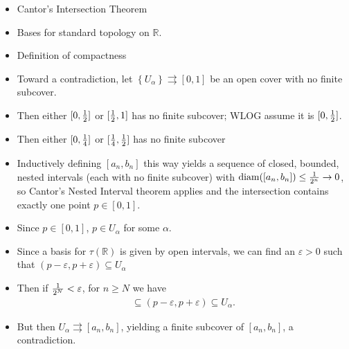\begin{solution}

\hfill

\begin{concept}

\hfill

\begin{itemize}
\tightlist
\item
  Cantor's Intersection Theorem
\item
  Bases for standard topology on \({\mathbb{R}}\).
\item
  Definition of compactness
\end{itemize}

\end{concept}

\begin{itemize}
\tightlist
\item
  Toward a contradiction, let
  \(\left\{{U_\alpha}\right\} \rightrightarrows[0, 1]\) be an open cover
  with no finite subcover.
\item
  Then either \([0, {1\over 2}]\) or \([{1\over 2}, 1]\) has no finite
  subcover; WLOG assume it is \([0, {1\over 2}]\).
\item
  Then either \([0, {1\over 4}]\) or \([{1\over 4}, {1\over 2}]\) has no
  finite subcover
\item
  Inductively defining \([a_n, b_n]\) this way yields a sequence of
  closed, bounded, nested intervals (each with no finite subcover) with
  \({\operatorname{diam}}([a_n, b_n]) \leq {1 \over 2^n} \to 0\), so
  Cantor's Nested Interval theorem applies and the intersection contains
  exactly one point \(p \in [0, 1]\).
\item
  Since \(p\in [0, 1]\), \(p\in U_\alpha\) for some \(\alpha\).
\item
  Since a basis for \(\tau({\mathbb{R}})\) is given by open intervals,
  we can find an \(\varepsilon>0\) such that
  \((p-\varepsilon, p+\varepsilon) \subseteq U_\alpha\)
\item
  Then if \({1\over 2^N} < \varepsilon\), for \(n\geq N\) we have
  \begin{align*}[a_n, b_n] \subseteq (p-\varepsilon, p+\varepsilon) \subseteq U_\alpha.\end{align*}
\item
  But then \(U_\alpha \rightrightarrows[a_n, b_n]\), yielding a finite
  subcover of \([a_n, b_n]\), a contradiction.
\end{itemize}

\end{solution}

